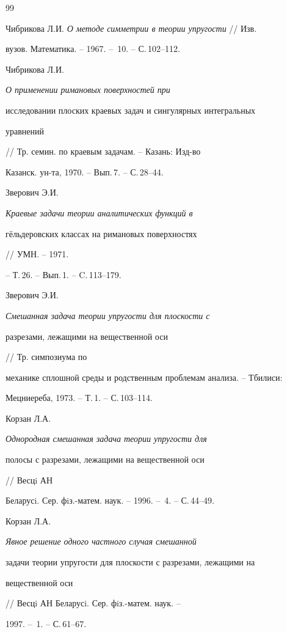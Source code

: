 \begin{thebibliography}{99} 


 




Чибрикова Л.И. {\em О методе симметрии в теории упругости} // Изв. 


вузов. Математика. -- 1967. -- \No\,10. -- С.\,102--112. 




Чибрикова Л.И. {\em О применении римановых поверхностей при 


исследовании плоских краевых задач и сингулярных интегральных 


уравнений} // Тр. семин. по краевым задачам. -- Казань: Изд-во 


Казанск. ун-та, 1970. -- Вып.\,7. -- С.\,28--44. 




Зверович Э.И. {\em Краевые задачи теории аналитических функций в 


г\"ельдеровских классах на римановых поверхностях} // УМН. -- 1971. 


-- Т.\,26. -- Вып.\,1. -- C.\,113--179. 




Зверович Э.И. {\em Смешанная задача теории упругости для плоскости с 


разрезами, лежащими на вещественной оси} // Тр. симпозиума по 


механике сплошной среды и родственным проблемам анализа. -- Тбилиси: 


Мецниереба, 1973. -- Т.\,1. -- С.\,103--114. 




Корзан Л.А. {\em Однородная смешанная задача теории упругости для 


полосы с разрезами, лежащими на вещественной оси} // Весцi АН 


Беларусi. Сер. фiз.-матем. наук. -- 1996. -- \No\,4. -- С.\,44--49. 




Корзан Л.А. {\em Явное решение одного частного случая смешанной 


задачи теории упругости для плоскости с разрезами, лежащими на 


вещественной оси} // Весцi АН Беларусi. Сер. фiз.-матем. наук. -- 


1997. -- \No\,1. -- С.\,61--67. 





\end{thebibliography}
